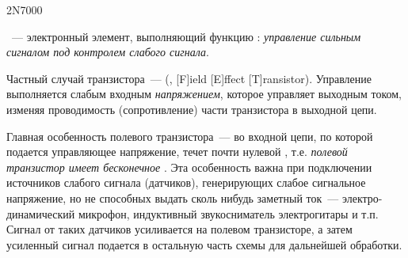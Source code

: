 
2N7000

\bigskip
{}\ --- электронный элемент, выполняющий функцию
: \emph{управление сильным сигналом под контролем
слабого сигнала}.

\bigskip
Частный случай транзистора\ ---  
(, [F]ield [E]ffect [T]ransistor). Управление выполняется
слабым входным \emph{напряжением}, которое управляет выходным током, изменяя
проводимость (сопротивление) части транзистора в выходной цепи. 

Главная особенность полевого транзистора\ --- во входной цепи, по которой
подается управляющее напряжение, течет почти нулевой , т.е. \emph{полевой транзистор имеет бесконечное
}. Эта особенность важна
при подключении источников слабого сигнала (датчиков), генерирующих слабое
сигнальное напряжение, но не способных выдать сколь нибудь заметный ток\ ---
электро-динамический микрофон, индуктивный звукосниматель электрогитары и т.п.
Сигнал от таких датчиков усиливается  на полевом транзисторе, а затем усиленный
сигнал подается в остальную часть схемы для дальнейшей обработки.
